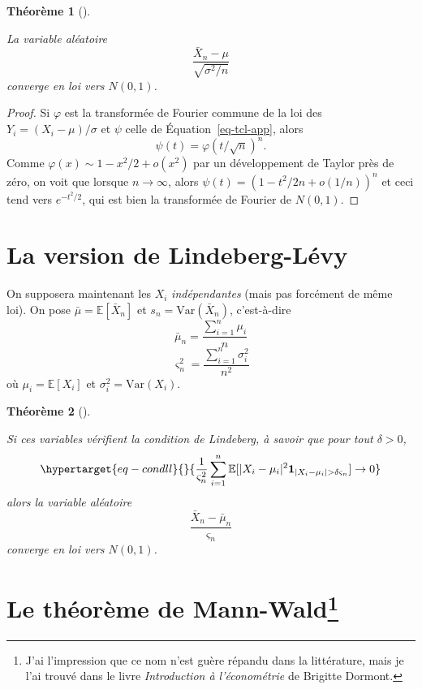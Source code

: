 \documentclass[
  10,
  letterpaper,
  DIV=11,
  numbers=noendperiod]{scrreport}
\theoremstyle{plain}
\newtheorem{theorem}{Théorème}[chapter]
\theoremstyle{definition}
\theoremstyle{plain}
\theoremstyle{definition}
\theoremstyle{definition}
\theoremstyle{plain}
\theoremstyle{remark}
\begin{document}
\begin{theorem}[]\protect\hypertarget{thm-tcl_app}{}\label{thm-tcl_app}

La variable aléatoire \[\frac{\bar{X}_n - \mu}{\sqrt{\sigma^2/n}}\]
converge en loi vers \(N(0,1)\).

\end{theorem}

\begin{proof}

Si \(\varphi\) est la transformée de Fourier commune de la loi des
\(Y_i = (X_i - \mu)/\sigma\) et \(\psi\) celle de
Équation~\ref{eq-tcl-app}, alors \[ \psi(t) = \varphi(t/\sqrt{n})^n.\]
Comme \(\varphi(x) \sim 1 - x^2/2 + o(x^2)\) par un développement de
Taylor près de zéro, on voit que lorsque \(n\to\infty\), alors
\(\psi(t) = (1 - t^2 / 2n + o(1/n))^n\) et ceci tend vers
\(e^{-t^2/2}\), qui est bien la transformée de Fourier de \(N(0,1)\).

\end{proof}

\hypertarget{la-version-de-lindeberg-luxe9vy}{%
\section{La version de
Lindeberg-Lévy}\label{la-version-de-lindeberg-luxe9vy}}

On supposera maintenant les \(X_i\) \emph{indépendantes} (mais pas
forcément de même loi). On pose \(\bar{\mu} = \mathbb{E}[\bar{X}_n]\) et
\(s_n = \mathrm{Var}(\bar{X}_n)\), c'est-à-dire
\[\bar{\mu}_n = \frac{\sum_{i=1}^n \mu_i}{n} \]
\[\varsigma^2_n = \frac{\sum_{i=1}^n \sigma_i^2}{n^2} \] où
\(\mu_i= \mathbb{E}[X_i]\) et \(\sigma_i^2 = \mathrm{Var}(X_i)\).

\begin{theorem}[]\protect\hypertarget{thm-tcl-ll}{}\label{thm-tcl-ll}

Si ces variables vérifient la \emph{condition de Lindeberg}, à savoir
que pour tout \(\delta >0\),
\begin{equation}\protect\hypertarget{eq-condll}{}{ \frac{1}{\varsigma_n^2}\sum_{i=1}^n \mathbb{E}[|X_i - \mu_i|^2 \mathbf{1}_{|X_i - \mu_i| > \delta \varsigma_n}] \to 0}\label{eq-condll}\end{equation}
alors la variable aléatoire
\[ \frac{\bar{X}_n - \bar{\mu}_n}{\varsigma_n}\] converge en loi vers
\(N(0,1)\).

\end{theorem}

\hypertarget{le-thuxe9oruxe8me-de-mann-wald}{%
\section[Le théorème de Mann-Wald]{\texorpdfstring{Le théorème de
Mann-Wald\footnote{J'ai l'impression que ce nom n'est guère répandu dans
  la littérature, mais je l'ai trouvé dans le livre \emph{Introduction à
  l'économétrie} de Brigitte Dormont.}}{Le théorème de Mann-Wald}}\label{le-thuxe9oruxe8me-de-mann-wald}}
\end{document}
